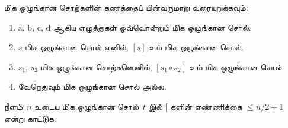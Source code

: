 \documentclass[../../../include/open-logic-section]{subfiles}
\begin{document}
\begin{prob}
  மிக ஒழுங்கான சொற்களின் கணத்தைப்
  பின்வருமாறு வரையறுக்கவும்:
  \begin{enumerate}
  \item $\mathrm{a}$, $\mathrm{b}$, $\mathrm{c}$,
    $\mathrm{d}$ ஆகிய எழுத்துகள் ஒவ்வொன்றும்
    மிக ஒழுங்கான சொல்.
  \item $s$ மிக ஒழுங்கான சொல் எனில்,
    $[s]$ உம் மிக ஒழுங்கான சொல்.
  \item $s_1$, $s_2$ மிக ஒழுங்கான சொற்களெனில்,
    $[s_1 \circ s_2]$ உம் மிக ஒழுங்கான சொல்.
  \item வேறெதுவும் மிக ஒழுங்கான சொல் அல்ல.
  \end{enumerate}
  நீளம்~$n$ உடைய மிக ஒழுங்கான சொல்~$t$
  இல் $[$ களின் எண்ணிக்கை $\le n/2 +1$
  என்று காட்டுக.
\end{prob}
\end{document}
